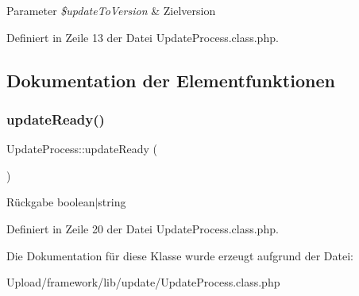\begin{DoxyParams}{Parameter}
{\em \$update\+To\+Version} & Zielversion \\
\hline
\end{DoxyParams}


Definiert in Zeile 13 der Datei Update\+Process.\+class.\+php.



\subsection{Dokumentation der Elementfunktionen}
\mbox{\label{class_update_process_aefaedcca35df60648cbd64f9aecef68c}} 
\subsubsection{\texorpdfstring{update\+Ready()}{updateReady()}}
{\footnotesize\ttfamily Update\+Process\+::update\+Ready (\begin{DoxyParamCaption}{ }\end{DoxyParamCaption})}

\begin{DoxyReturn}{Rückgabe}
boolean$\vert$string 
\end{DoxyReturn}


Definiert in Zeile 20 der Datei Update\+Process.\+class.\+php.



Die Dokumentation für diese Klasse wurde erzeugt aufgrund der Datei\+:\begin{DoxyCompactItemize}
\item 
Upload/framework/lib/update/Update\+Process.\+class.\+php\end{DoxyCompactItemize}
